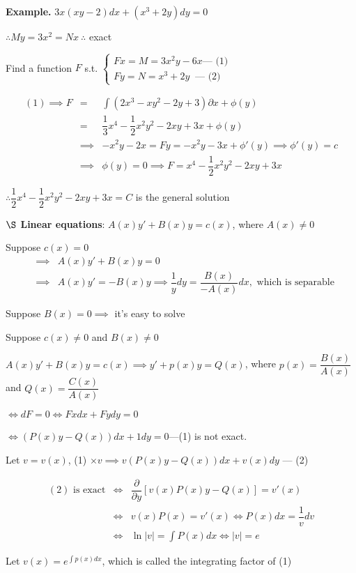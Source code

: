 \textbf{Example.} $3x(xy - 2)dx + (x^3 + 2y)dy = 0$

\begin{solution}
	$\therefore My = 3x^2 = Nx ~\therefore$ exact
	
	Find a function $F$ s.t. $\begin{cases}
		Fx = M = 3x^2y - 6x \text{--- (1)}\\
		Fy = N = x^3 + 2y ~\text{   --- (2)}
	\end{cases}$ 
	
	\begin{eqnarray*}
		(1) \implies F &=& \int (2x^3 - xy^2 - 2y + 3) \partial x + \phi (y)\\
		&=& \dfrac{1}{3}x^4 - \dfrac{1}{2}x^2y^2 - 2xy + 3x + \phi(y)\\
		&\implies& -x^2y-2x=Fy = -x^2y - 3x + \phi'(y) \implies \phi'(y) = c\\
		&\implies& \phi (y) = 0 \implies F = x^4 - \dfrac{1}{2}x^2y^2 - 2xy + 3x
	\end{eqnarray*}
	
	$\therefore \dfrac{1}{2}x^4 - \dfrac{1}{2}x^2y^2 - 2xy + 3x = C$ is the general solution
\end{solution}

\textbf{$\S$ Linear equations}: $A(x)y' + B(x)y = c(x)$, where $A(x) \neq 0$


Suppose $c(x) = 0$
\begin{eqnarray*}
	&\implies& A(x)y' + B(x)y = 0\\
	&\implies& A(x)y' = -B(x)y \implies \dfrac{1}{y}dy = \dfrac{B(x)}{-A(x)}dx, \text{ which is separable}
\end{eqnarray*}

Suppose $B(x) = 0 \implies$ it's easy to solve

Suppose $c(x) \neq 0$ and $B(x) \neq 0$

$A(x)y' + B(x)y = c(x) \implies y' + p(x)y = Q(x)$, where $p(x) = \dfrac{B(x)}{A(x)}$ and $Q(x) = \dfrac{C(x)}{A(x)}$

$\Leftrightarrow dF = 0 \Leftrightarrow Fxdx + Fydy = 0$

$\Leftrightarrow (P(x)y - Q(x))dx + 1dy = 0$---(1) is not exact.

Let $v = v(x)$, (1) $\times v \implies v(P(x)y - Q(x))dx + v(x)dy$ --- (2)

\begin{eqnarray*}
	(2) \text{ is exact} &\Leftrightarrow& \dfrac{\partial}{\partial y} \left[ v(x)P(x)y - Q(x)\right] = v'(x)\\
	&\Leftrightarrow& v(x)P(x) = v'(x) \Leftrightarrow P(x)dx = \dfrac{1}{v}dv\\
	&\Leftrightarrow& \ln|v| = \int P(x)dx \Leftrightarrow |v| = e
\end{eqnarray*}

Let $v(x) = e^{\int p(x)dx}$, which is called the integrating factor of (1)

























